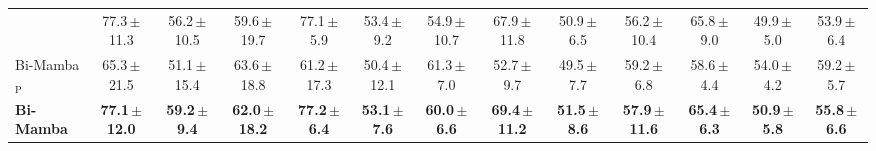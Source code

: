 \documentclass[sigconf,nonacm]{acmart}
\begin{document}
\begin{table}[t]
{\begin{tabular}{lcccccccccccc}
      & 77.3{\scriptsize\,$\pm$11.3} & 56.2{\scriptsize\,$\pm$10.5} & 59.6{\scriptsize\,$\pm$19.7}
      & 77.1{\scriptsize\,$\pm$5.9}  & 53.4{\scriptsize\,$\pm$9.2}  & 54.9{\scriptsize\,$\pm$10.7}
      & 67.9{\scriptsize\,$\pm$11.8} & 50.9{\scriptsize\,$\pm$6.5}  & 56.2{\scriptsize\,$\pm$10.4}
      & 65.8{\scriptsize\,$\pm$9.0}  & 49.9{\scriptsize\,$\pm$5.0}  & 53.9{\scriptsize\,$\pm$6.4} \\
    Bi-Mamba$_{\text{P}}$
      & 65.3{\scriptsize\,$\pm$21.5} & 51.1{\scriptsize\,$\pm$15.4} & 63.6{\scriptsize\,$\pm$18.8}
      & 61.2{\scriptsize\,$\pm$17.3} & 50.4{\scriptsize\,$\pm$12.1} & 61.3{\scriptsize\,$\pm$7.0}
      & 52.7{\scriptsize\,$\pm$9.7}  & 49.5{\scriptsize\,$\pm$7.7}  & 59.2{\scriptsize\,$\pm$6.8}
      & 58.6{\scriptsize\,$\pm$4.4}  & 54.0{\scriptsize\,$\pm$4.2}  & 59.2{\scriptsize\,$\pm$5.7} \\
    \textbf{Bi-Mamba}
      & \textbf{77.1{\scriptsize\,$\pm$12.0}} & \textbf{59.2{\scriptsize\,$\pm$9.4}}  & \textbf{62.0{\scriptsize\,$\pm$18.2}}
      & \textbf{77.2{\scriptsize\,$\pm$6.4}}  & \textbf{53.1{\scriptsize\,$\pm$7.6}}  & \textbf{60.0{\scriptsize\,$\pm$6.6}}
      & \textbf{69.4{\scriptsize\,$\pm$11.2}} & \textbf{51.5{\scriptsize\,$\pm$8.6}}  & \textbf{57.9{\scriptsize\,$\pm$11.6}}
      & \textbf{65.4{\scriptsize\,$\pm$6.3}}  & \textbf{50.9{\scriptsize\,$\pm$5.8}}  & \textbf{55.8{\scriptsize\,$\pm$6.6}} \\
    \bottomrule
  \end{tabular}%
  }
\end{table}
\end{document}

